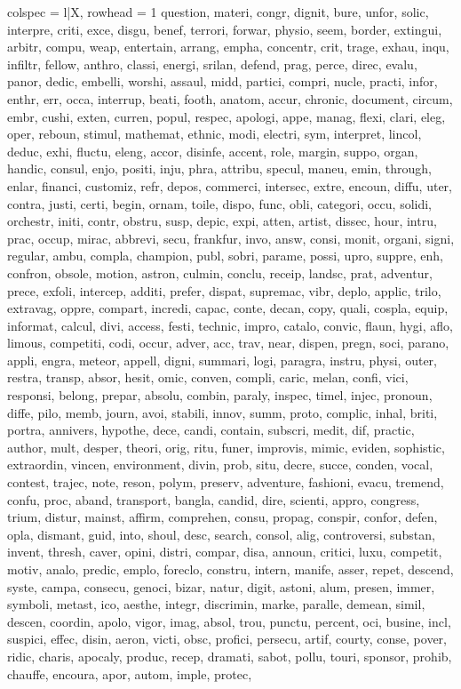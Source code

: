 \begin{tblr}[
  long,
  caption = {Examples from SNLI.},
  entry = {Short Caption},
  label = {tblr:test},
]{
colspec = {l|X},
rowhead = 1}
question, materi, congr, dignit, bure, unfor, solic, interpre, criti, exce, disgu, benef, terrori, forwar, physio, seem, border, extingui, arbitr, compu, weap, entertain, arrang, empha, concentr, crit, trage, exhau, inqu, infiltr, fellow, anthro, classi, energi, srilan, defend, prag, perce, direc, evalu, panor, dedic, embelli, worshi, assaul, midd, partici, compri, nucle, practi, infor, enthr, err, occa, interrup, beati, footh, anatom, accur, chronic, document, circum, embr, cushi, exten, curren, popul, respec, apologi, appe, manag, flexi, clari, eleg, oper, reboun, stimul, mathemat, ethnic, modi, electri, sym, interpret, lincol, deduc, exhi, fluctu, eleng, accor, disinfe, accent, role, margin, suppo, organ, handic, consul, enjo, positi, inju, phra, attribu, specul, maneu, emin, through, enlar, financi, customiz, refr, depos, commerci, intersec, extre, encoun, diffu, uter, contra, justi, certi, begin, ornam, toile, dispo, func, obli, categori, occu, solidi, orchestr, initi, contr, obstru, susp, depic, expi, atten, artist, dissec, hour, intru, prac, occup, mirac, abbrevi, secu, frankfur, invo, answ, consi, monit, organi, signi, regular, ambu, compla, champion, publ, sobri, parame, possi, upro, suppre, enh, confron, obsole, motion, astron, culmin, conclu, receip, landsc, prat, adventur, prece, exfoli, intercep, additi, prefer, dispat, supremac, vibr, deplo, applic, trilo, extravag, oppre, compart, incredi, capac, conte, decan, copy, quali, cospla, equip, informat, calcul, divi, access, festi, technic, impro, catalo, convic, flaun, hygi, aflo, limous, competiti, codi, occur, adver, acc, trav, near, dispen, pregn, soci, parano, appli, engra, meteor, appell, digni, summari, logi, paragra, instru, physi, outer, restra, transp, absor, hesit, omic, conven, compli, caric, melan, confi, vici, responsi, belong, prepar, absolu, combin, paraly, inspec, timel, injec, pronoun, diffe, pilo, memb, journ, avoi, stabili, innov, summ, proto, complic, inhal, briti, portra, annivers, hypothe, dece, candi, contain, subscri, medit, dif, practic, author, mult, desper, theori, orig, ritu, funer, improvis, mimic, eviden, sophistic, extraordin, vincen, environment, divin, prob, situ, decre, succe, conden, vocal, contest, trajec, note, reson, polym, preserv, adventure, fashioni, evacu, tremend, confu, proc, aband, transport, bangla, candid, dire, scienti, appro, congress, trium, distur, mainst, affirm, comprehen, consu, propag, conspir, confor, defen, opla, dismant, guid, into, shoul, desc, search, consol, alig, controversi, substan, invent, thresh, caver, opini, distri, compar, disa, announ, critici, luxu, competit, motiv, analo, predic, emplo, foreclo, constru, intern, manife, asser, repet, descend, syste, campa, consecu, genoci, bizar, natur, digit, astoni, alum, presen, immer, symboli, metast, ico, aesthe, integr, discrimin, marke, paralle, demean, simil, descen, coordin, apolo, vigor, imag, absol, trou, punctu, percent, oci, busine, incl, suspici, effec, disin, aeron, victi, obsc, profici, persecu, artif, courty, conse, pover, ridic, charis, apocaly, produc, recep, dramati, sabot, pollu, touri, sponsor, prohib, chauffe, encoura, apor, autom, imple, protec, 
\end{tblr}
